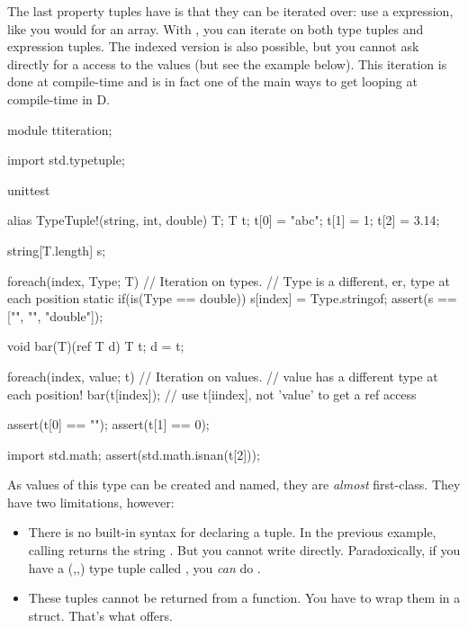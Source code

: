 The last property tuples have is that they can be iterated over: use a  expression, like you would for an array. With , you can iterate on both type tuples and expression tuples. The indexed version is also possible, but you cannot ask directly for a  access to the values (but see the example below). This iteration is done at compile-time and is in fact one of the main ways to get looping at compile-time in D.

\begin{dcode}
module ttiteration;

import std.typetuple;

unittest
{
    alias TypeTuple!(string, int, double) T;
    T t;
    t[0] = "abc";
    t[1] = 1;
    t[2] = 3.14;

    string[T.length] s;

    foreach(index, Type; T) // Iteration on types.
                            // Type is a different, er, type at each position
    {
        static if(is(Type == double))
            s[index] = Type.stringof;
    }
    assert(s ==  ["", "", "double"]);

    void bar(T)(ref T d) { T t; d = t;}

    foreach(index, value; t) // Iteration on values.
                             // value has a different type at each position!
    {
        bar(t[index]); // use t[iindex], not 'value' to get a ref access
    }

    assert(t[0] == "");
    assert(t[1] == 0);
    
    import std.math;
    assert(std.math.isnan(t[2]));
}
\end{dcode}

As values of this type can be created and named, they are \emph{almost} first-class. They have two limitations, however: 

\begin{itemize}
\item There is no built-in syntax for declaring a tuple. In the previous example, calling  returns the string \DD{,}\DD{,}. But you cannot write \DD{(}\DD{,}\DD{,} directly. Paradoxically, if you have a (,,) type tuple called , you \emph{can} do .
\item These tuples cannot be returned from a function. You have to wrap them in a struct. That's what  offers.
\end{itemize}

